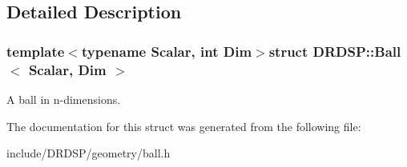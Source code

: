\subsection{Detailed Description}
\subsubsection*{template$<$typename Scalar, int Dim$>$struct D\-R\-D\-S\-P\-::\-Ball$<$ Scalar, Dim $>$}

A ball in n-\/dimensions. 

The documentation for this struct was generated from the following file\-:\begin{DoxyCompactItemize}
\item 
include/\-D\-R\-D\-S\-P/geometry/ball.\-h\end{DoxyCompactItemize}
